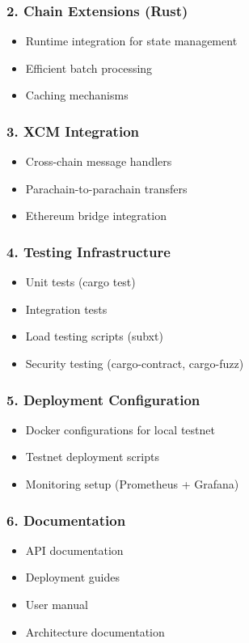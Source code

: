 \documentclass[12pt,a4paper]{article}
\begin{document}
\subsubsection*{2. Chain Extensions (Rust)}
\begin{itemize}
    \item Runtime integration for state management
    \item Efficient batch processing
    \item Caching mechanisms
\end{itemize}

\subsubsection*{3. XCM Integration}
\begin{itemize}
    \item Cross-chain message handlers
    \item Parachain-to-parachain transfers
    \item Ethereum bridge integration
\end{itemize}

\subsubsection*{4. Testing Infrastructure}
\begin{itemize}
    \item Unit tests (cargo test)
    \item Integration tests
    \item Load testing scripts (subxt)
    \item Security testing (cargo-contract, cargo-fuzz)
\end{itemize}

\subsubsection*{5. Deployment Configuration}
\begin{itemize}
    \item Docker configurations for local testnet
    \item Testnet deployment scripts
    \item Monitoring setup (Prometheus + Grafana)
\end{itemize}

\subsubsection*{6. Documentation}
\begin{itemize}
    \item API documentation
    \item Deployment guides
    \item User manual
    \item Architecture documentation
\end{itemize}
\end{document}
